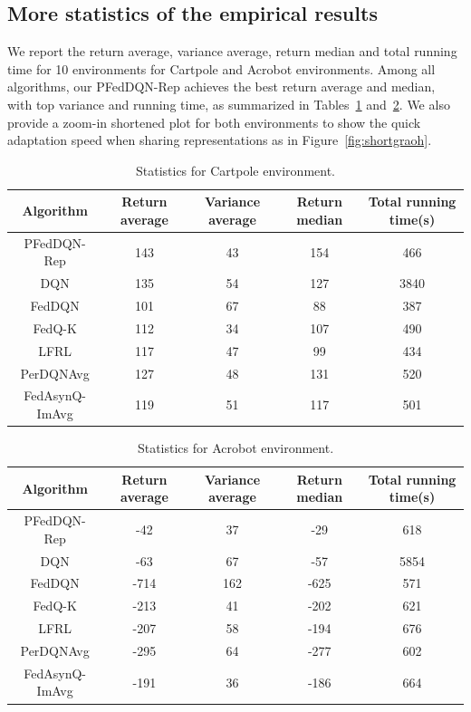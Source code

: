\documentclass{article} %
\theoremstyle{plain}
\theoremstyle{definition}
\theoremstyle{remark}
\begin{document}
{\begin{figure}[h]
 \end{figure}



\subsection{More statistics of the empirical results} 


We report the return average, variance average, return median and total running time for 10 environments for Cartpole and Acrobot environments. Among all algorithms, our PFedDQN-Rep achieves the best return average and median, with top variance and running time, as summarized in Tables~\ref{table:additionalresult} and~\ref{table:additionalresultacro}. We also provide a zoom-in shortened plot for both environments to show the quick adaptation speed when sharing representations as in Figure~\ref{fig:shortgraoh}.





 \begin{table}[h]
\begin{center}
\caption{{Statistics for Cartpole environment.}} \label{table:additionalresult} 
\begin{tabular}{||c|c|c|c|c||}
 \hline
 Algorithm & Return average & Variance average & Return median & Total running time(s)\\  
 \hline\hline
 PFedDQN-Rep & 143 &43 &154 &466\\ 
 \hline
 DQN & 135 &54 &127 &3840\\ 
 \hline
  FedDQN & 101 &67 &88 &387\\ 
 \hline
  FedQ-K & 112 &34 &107 &490\\ 
 \hline
  LFRL & 117 &47 &99 &434\\ 
 \hline
  PerDQNAvg & 127 &48 &131 &520\\ 
 \hline
  FedAsynQ-ImAvg & 119 &51 &117 &501\\ 
 \hline
 
\end{tabular}
\end{center}
\end{table}


 \begin{table}[h]
\begin{center}
\caption{{Statistics  for Acrobot environment.}} \label{table:additionalresultacro} 
\begin{tabular}{||c|c|c|c|c||}
 \hline
 Algorithm & Return average & Variance average & Return median & Total running time(s)\\  
 \hline\hline
 PFedDQN-Rep & -42 &37 &-29 &618\\ 
 \hline
 DQN & -63 &67 &-57 &5854\\ 
 \hline
  FedDQN & -714 &162 &-625 &571\\ 
 \hline
  FedQ-K & -213 &41 &-202 &621\\ 
 \hline
  LFRL & -207 &58 &-194 &676\\ 
 \hline
  PerDQNAvg & -295 &64 &-277 &602\\ 
 \hline
  FedAsynQ-ImAvg & -191 &36 &-186 &664\\ 
 \hline
 

\end{tabular}
\end{center}
\end{table}}
\end{document}
